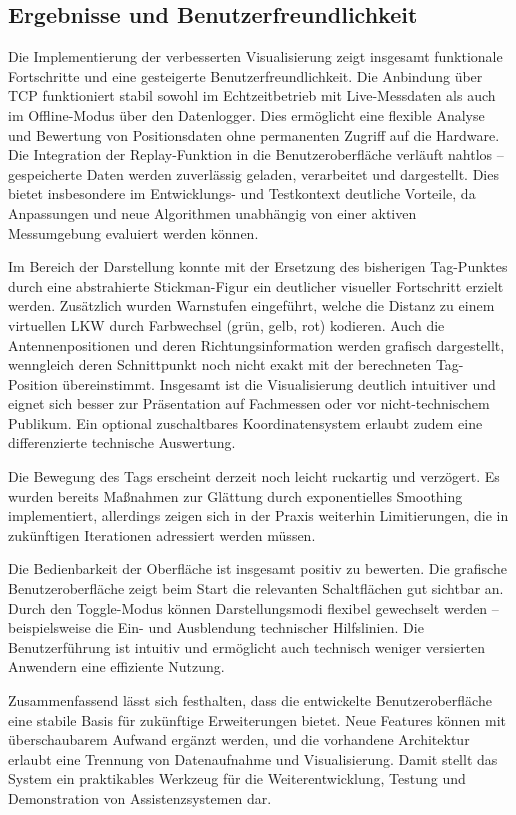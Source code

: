 \documentclass[a4paper, 12pt]{article} %
\begin{document}
\subsection{Ergebnisse und Benutzerfreundlichkeit}

Die Implementierung der verbesserten Visualisierung zeigt insgesamt funktionale Fortschritte und eine gesteigerte Benutzerfreundlichkeit. Die Anbindung 
über \ac{TCP} funktioniert stabil sowohl im Echtzeitbetrieb mit Live-Messdaten als auch im Offline-Modus über den Datenlogger. Dies ermöglicht eine flexible 
Analyse und Bewertung von Positionsdaten ohne permanenten Zugriff auf die Hardware. Die Integration der Replay-Funktion in die Benutzeroberfläche verläuft
nahtlos – gespeicherte Daten werden zuverlässig geladen, verarbeitet und dargestellt. Dies bietet insbesondere im Entwicklungs- und Testkontext deutliche
Vorteile, da Anpassungen und neue Algorithmen unabhängig von einer aktiven Messumgebung evaluiert werden können.

Im Bereich der Darstellung konnte mit der Ersetzung des bisherigen Tag-Punktes durch eine abstrahierte Stickman-Figur ein deutlicher visueller 
Fortschritt erzielt werden. Zusätzlich wurden Warnstufen eingeführt, welche die Distanz zu einem virtuellen \ac{LKW} durch Farbwechsel (grün, gelb, rot) 
kodieren. Auch die Antennenpositionen und deren Richtungsinformation werden grafisch dargestellt, wenngleich deren Schnittpunkt noch nicht exakt mit der 
berechneten Tag-Position übereinstimmt. Insgesamt ist die Visualisierung deutlich intuitiver und eignet sich besser zur Präsentation auf Fachmessen oder
vor nicht-technischem Publikum. Ein optional zuschaltbares Koordinatensystem erlaubt zudem eine differenzierte technische Auswertung.

Die Bewegung des Tags erscheint derzeit noch leicht ruckartig und verzögert. Es wurden bereits Maßnahmen zur Glättung durch exponentielles Smoothing 
implementiert, allerdings zeigen sich in der Praxis weiterhin Limitierungen, die in zukünftigen Iterationen adressiert werden müssen.

Die Bedienbarkeit der Oberfläche ist insgesamt positiv zu bewerten. Die grafische Benutzeroberfläche zeigt beim Start die relevanten Schaltflächen gut 
sichtbar an. Durch den Toggle-Modus können Darstellungsmodi flexibel gewechselt werden – beispielsweise die Ein- und Ausblendung technischer Hilfslinien. 
Die Benutzerführung ist intuitiv und ermöglicht auch technisch weniger versierten Anwendern eine effiziente Nutzung.

Zusammenfassend lässt sich festhalten, dass die entwickelte Benutzeroberfläche eine stabile Basis für zukünftige Erweiterungen bietet. Neue Features 
können mit überschaubarem Aufwand ergänzt werden, und die vorhandene Architektur erlaubt eine Trennung von Datenaufnahme und Visualisierung. Damit stellt
das System ein praktikables Werkzeug für die Weiterentwicklung, Testung und Demonstration von Assistenzsystemen dar.
\end{document}
